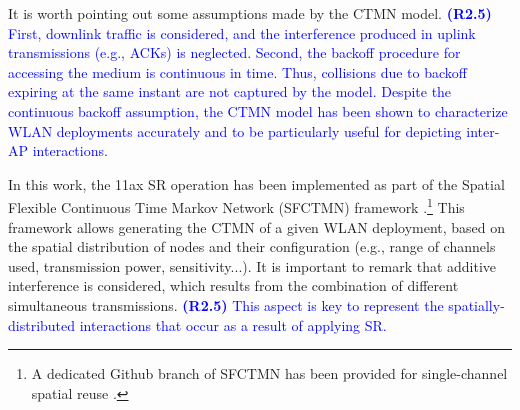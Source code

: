 \documentclass{ieeeaccess}
\begin{document}
It is worth pointing out some assumptions made by the CTMN model. \textcolor{blue}{\textbf{(R2.5)} First, downlink traffic is considered, and the interference produced in uplink transmissions (e.g., ACKs) is neglected. Second, the backoff procedure for accessing the medium is continuous in time. Thus, collisions due to backoff expiring at the same instant are not captured by the model. Despite the continuous backoff assumption, the CTMN model has been shown to characterize WLAN deployments accurately \cite{bellalta2016throughput,michaloliakos2016performance} and to be particularly useful for depicting inter-AP interactions.}



In this work, the 11ax SR operation has been implemented as part of the Spatial Flexible Continuous Time Markov Network (SFCTMN) framework \cite{barrachina2019dynamic, barrachina2019overlap, wilhelmi2019potential}.\footnote{A dedicated Github branch of SFCTMN has been provided for single-channel spatial reuse \cite{wilhelmi2019sfctm_spatial_reuse}.} This framework allows generating the CTMN of a given WLAN deployment, based on the spatial distribution of nodes and their configuration (e.g., range of channels used, transmission power, sensitivity...). It is important to remark that additive interference is considered, which results from the combination of different simultaneous transmissions. \textcolor{blue}{\textbf{(R2.5)} This aspect is key to represent the spatially-distributed interactions that occur as a result of applying SR.}
\end{document}
